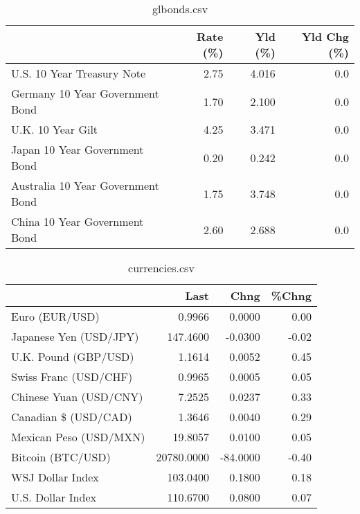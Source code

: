 \documentclass{article}%
\begin{document}
%


\begin{table}[htbp]%
\caption{glbonds.csv}%
\centering%
\begin{adjustbox}{width=1\textwidth}%
\begin{tabular}{lrrr}
\toprule
                                  &  Rate (\%) &  Yld (\%) &  Yld Chg (\%) \\
\midrule
       U.S. 10 Year Treasury Note &      2.75 &    4.016 &          0.0 \\
  Germany 10 Year Government Bond &      1.70 &    2.100 &          0.0 \\
                U.K. 10 Year Gilt &      4.25 &    3.471 &          0.0 \\
    Japan 10 Year Government Bond &      0.20 &    0.242 &          0.0 \\
Australia 10 Year Government Bond &      1.75 &    3.748 &          0.0 \\
    China 10 Year Government Bond &      2.60 &    2.688 &          0.0 \\
\bottomrule
\end{tabular}
%
\end{adjustbox}%
\end{table}

%


\begin{table}[htbp]%
\caption{currencies.csv}%
\centering%
\begin{adjustbox}{width=1\textwidth}%
\begin{tabular}{lrrr}
\toprule
                       &       Last &     Chng &  \%Chng \\
\midrule
        Euro (EUR/USD) &     0.9966 &   0.0000 &   0.00 \\
Japanese Yen (USD/JPY) &   147.4600 &  -0.0300 &  -0.02 \\
  U.K. Pound (GBP/USD) &     1.1614 &   0.0052 &   0.45 \\
 Swiss Franc (USD/CHF) &     0.9965 &   0.0005 &   0.05 \\
Chinese Yuan (USD/CNY) &     7.2525 &   0.0237 &   0.33 \\
  Canadian \$ (USD/CAD) &     1.3646 &   0.0040 &   0.29 \\
Mexican Peso (USD/MXN) &    19.8057 &   0.0100 &   0.05 \\
     Bitcoin (BTC/USD) & 20780.0000 & -84.0000 &  -0.40 \\
      WSJ Dollar Index &   103.0400 &   0.1800 &   0.18 \\
     U.S. Dollar Index &   110.6700 &   0.0800 &   0.07 \\
\bottomrule
\end{tabular}
%
\end{adjustbox}%
\end{table}

%
\end{document}
